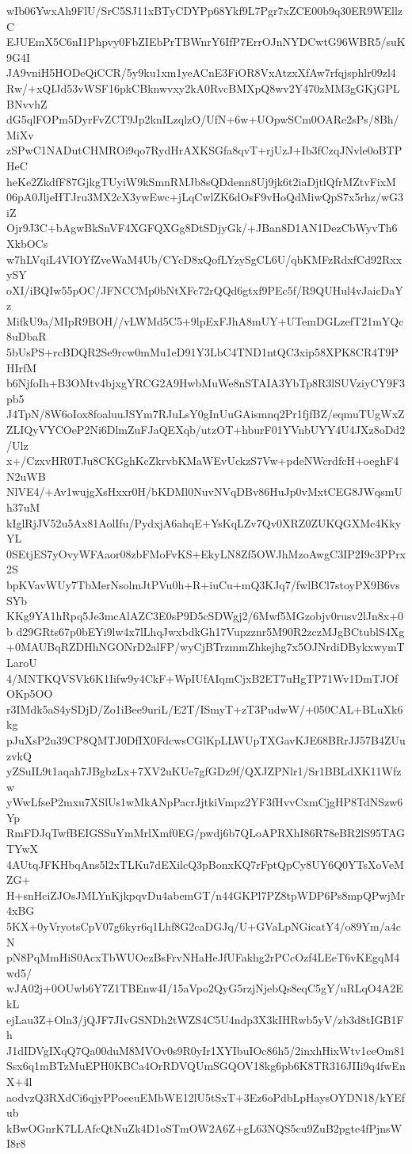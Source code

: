 wIb06YwxAh9FlU/SrC5SJ11xBTyCDYPp68Ykf9L7Pgr7xZCE00b9q30ER9WEllzC
EJUEmX5C6nI1Phpvy0FbZIEbPrTBWnrY6IfP7ErrOJnNYDCwtG96WBR5/suK9G4I
JA9vniH5HODeQiCCR/5y9ku1xm1yeACnE3FiOR8VxAtzxXfAw7rfqjsphlr09zl4
Rw/+xQIJd53vWSF16pkCBknwvxy2kA0RvcBMXpQ8wv2Y470zMM3gGKjGPLBNvvhZ
dG5qlFOPm5DyrFvZCT9Jp2knILzqlzO/UfN+6w+UOpwSCm0OARe2sPs/8Bh/MiXv
zSPwC1NADutCHMROi9qo7RydHrAXKSGfa8qvT+rjUzJ+Ib3fCzqJNvle0oBTPHeC
heKe2ZkdfF87GjkgTUyiW9kSmnRMJb8sQDdenn8Uj9jk6t2iaDjtlQfrMZtvFixM
06pA0JljeHTJru3MX2cX3ywEwc+jLqCwlZK6dOsF9vHoQdMiwQpS7x5rhz/wG3iZ
Ojr9J3C+bAgwBkSnVF4XGFQXGg8DtSDjyGk/+JBan8D1AN1DezCbWyvTh6XkbOCs
w7hLVqiL4VIOYfZveWaM4Ub/CYcD8xQofLYzySgCL6U/qbKMFzRdxfCd92RxxySY
oXI/iBQIw55pOC/JFNCCMp0bNtXFc72rQQd6gtxf9PEc5f/R9QUHul4vJaicDaYz
MifkU9a/MIpR9BOH//vLWMd5C5+9lpExFJhA8mUY+UTemDGLzefT21mYQc8uDbaR
5bUsPS+rcBDQR2Se9rcw0mMu1eD91Y3LbC4TND1ntQC3xip58XPK8CR4T9PHIrfM
b6NjfoIh+B3OMtv4bjxgYRCG2A9HwbMuWe8nSTAIA3YbTp8R3lSUVziyCY9F3pb5
J4TpN/8W6oIox8foaluuJSYm7RJuLsY0gInUuGAismnq2Pr1fjfBZ/eqmuTUgWxZ
ZLIQyVYCOeP2Ni6DlmZuFJaQEXqb/utzOT+hburF01YVnbUYY4U4JXz8oDd2/Ulz
x+/CzxvHR0TJu8CKGghKcZkrvbKMaWEvUckzS7Vw+pdeNWcrdfcH+oeghF4N2uWB
NlVE4/+Av1wujgXsHxxr0H/bKDMl0NuvNVqDBv86HuJp0vMxtCEG8JWqsmUh37uM
kIglRjJV52u5Ax81AolIfu/PydxjA6ahqE+YsKqLZv7Qv0XRZ0ZUKQGXMc4KkyYL
0SEtjES7yOvyWFAaor08zbFMoFvKS+EkyLN8Zf5OWJhMzoAwgC3IP2I9c3PPrx2S
bpKVavWUy7TbMerNsolmJtPVu0h+R+iuCu+mQ3KJq7/fwlBCl7stoyPX9B6vsSYb
KKg9YA1hRpq5Je3mcAlAZC3E0sP9D5cSDWgj2/6Mwf5MGzobjv0rusv2lJn8x+0b
d29GRts67p0bEYi9lw4x7lLhqJwxbdkGh17Vupzznr5M90R2zczMJgBCtublS4Xg
+0MAUBqRZDHhNGONrD2alFP/wyCjBTrzmmZhkejhg7x5OJNrdiDBykxwymTLaroU
4/MNTKQVSVk6K1Iifw9y4CkF+WpIUfAIqmCjxB2ET7uHgTP71Wv1DmTJOfOKp5OO
r3IMdk5aS4ySDjD/Zo1iBee9uriL/E2T/ISmyT+zT3PudwW/+050CAL+BLuXk6kg
pJuXsP2u39CP8QMTJ0DfIX0FdcwsCGlKpLLWUpTXGavKJE68BRrJJ57B4ZUuzvkQ
yZSuIL9t1aqah7JBgbzLx+7XV2uKUe7gfGDz9f/QXJZPNlr1/Sr1BBLdXK11Wfzw
yWwLfseP2mxu7XSlUs1wMkANpPacrJjtkiVmpz2YF3fHvvCxmCjgHP8TdNSzw6Yp
RmFDJqTwfBEIGSSuYmMrlXmf0EG/pwdj6b7QLoAPRXhI86R78eBR2lS95TAGTYwX
4AUtqJFKHbqAns5l2xTLKu7dEXilcQ3pBonxKQ7rFptQpCy8UY6Q0YTsXoVeMZG+
H+snHciZJOsJMLYnKjkpqvDu4abemGT/n44GKPl7PZ8tpWDP6Ps8mpQPwjMr4xBG
5KX+0yVryotsCpV07g6kyr6q1Lhf8G2caDGJq/U+GVaLpNGicatY4/o89Ym/a4cN
pN8PqMmHiS0AcxTbWUOezBsFrvNHaHeJfUFakhg2rPCcOzf4LEeT6vKEgqM4wd5/
wJA02j+0OUwb6Y7Z1TBEnw4I/15aVpo2QyG5rzjNjebQs8eqC5gY/uRLqO4A2EkL
ejLau3Z+Oln3/jQJF7JIvGSNDh2tWZS4C5U4ndp3X3kIHRwb5yV/zb3d8tIGB1Fh
J1dIDVgIXqQ7Qa00duM8MVOv0s9R0yIr1XYIbuIOc86h5/2inxhHixWtv1ceOm81
Ssx6q1mBTzMuEPH0KBCa4OrRDVQUmSGQOV18kg6pb6K8TR316JIIi9q4fwEnX+4l
aodvzQ3RXdCi6qjyPPoeeuEMbWE12lU5tSxT+3Ez6oPdbLpHaysOYDN18/kYEfub
kBwOGnrK7LLAfcQtNuZk4D1oSTmOW2A6Z+gL63NQS5cu9ZuB2pgte4fPjnsWI8r8
